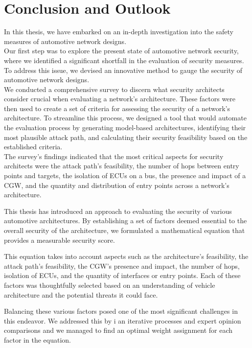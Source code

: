 \chapter{Conclusion and Outlook}
\label{chp:conclusion}

In this thesis, we have embarked on an in-depth investigation into the safety measures of automotive network designs.\\

Our first step was to explore the present state of automotive network security, 
where we identified a significant shortfall in the evaluation of security measures. 
To address this issue, we devised an innovative method to gauge the security of automotive network designs.\\

We conducted a comprehensive survey to discern what security architects consider crucial when evaluating a network's architecture. 
These factors were then used to create a set of criteria for assessing the security of a network's architecture. 
To streamline this process, we designed a tool that would automate the evaluation process by generating model-based architectures, 
identifying their most plausible attack path, and calculating their security feasibility based on the established criteria.\\

The survey's findings indicated that the most critical aspects for security architects were the attack path's feasibility, 
the number of hops between entry points and targets, the isolation of ECUs on a bus, 
the presence and impact of a CGW, and the quantity and distribution of entry points across a network's architecture.

This thesis has introduced an approach to evaluating the security of various automotive architectures. 
By establishing a set of factors deemed essential to the overall security of the architecture, 
we formulated a mathematical equation that provides a measurable security score.

This equation takes into account aspects such as the architecture's feasibility, the attack path's feasibility, 
the CGW's presence and impact, the number of hops, isolation of ECUs, and the quantity of interfaces or entry points. 
Each of these factors was thoughtfully selected based on an understanding of vehicle architecture and the potential threats it could face.

Balancing these various factors posed one of the most significant challenges in this endeavor. 
We addressed this by i an iterative processes and expert opinion comparisons and
we managed to find an optimal weight assignment for each factor in the equation.

